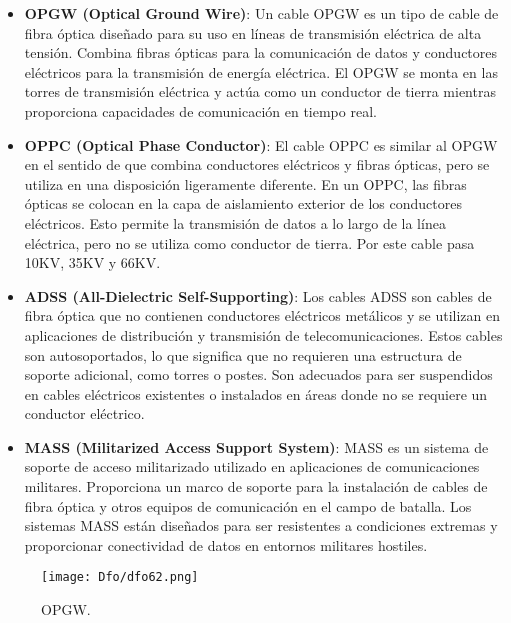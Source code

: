\documentclass[
	12pt, %
	fleqn, %
	a4paper, %
	oneside, %
]{LegrandOrangeBook}
\begin{document}
\begin{itemize}
\item \textbf{OPGW (Optical Ground Wire)}: Un cable OPGW es un tipo de cable de fibra óptica diseñado para su uso en líneas de transmisión eléctrica de alta tensión. Combina fibras ópticas para la comunicación de datos y conductores eléctricos para la transmisión de energía eléctrica. El OPGW se monta en las torres de transmisión eléctrica y actúa como un conductor de tierra mientras proporciona capacidades de comunicación en tiempo real.
\item \textbf{OPPC (Optical Phase Conductor)}: El cable OPPC es similar al OPGW en el sentido de que combina conductores eléctricos y fibras ópticas, pero se utiliza en una disposición ligeramente diferente. En un OPPC, las fibras ópticas se colocan en la capa de aislamiento exterior de los conductores eléctricos. Esto permite la transmisión de datos a lo largo de la línea eléctrica, pero no se utiliza como conductor de tierra. Por este cable pasa 10KV, 35KV y 66KV.
\item \textbf{ADSS (All-Dielectric Self-Supporting)}: Los cables ADSS son cables de fibra óptica que no contienen conductores eléctricos metálicos y se utilizan en aplicaciones de distribución y transmisión de telecomunicaciones. Estos cables son autosoportados, lo que significa que no requieren una estructura de soporte adicional, como torres o postes. Son adecuados para ser suspendidos en cables eléctricos existentes o instalados en áreas donde no se requiere un conductor eléctrico.
\item \textbf{MASS (Militarized Access Support System)}: MASS es un sistema de soporte de acceso militarizado utilizado en aplicaciones de comunicaciones militares. Proporciona un marco de soporte para la instalación de cables de fibra óptica y otros equipos de comunicación en el campo de batalla. Los sistemas MASS están diseñados para ser resistentes a condiciones extremas y proporcionar conectividad de datos en entornos militares hostiles.
\end{itemize}
\begin{figure}[H]
\centering
\texttt{[image: Dfo/dfo62.png]}
\caption{OPGW.}
\end{figure}
\end{document}
